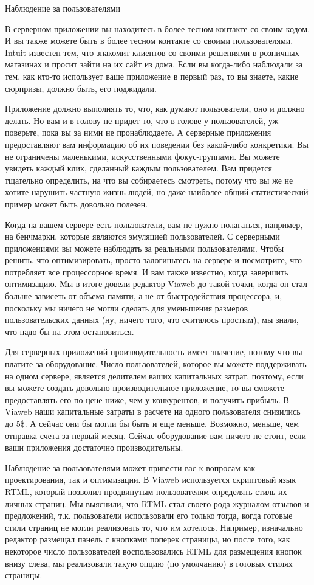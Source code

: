 \documentclass[ebook,12pt,oneside,openany]{memoir}
\begin{document}
Наблюдение за пользователями

В серверном приложении вы находитесь в более тесном контакте со своим
кодом. И вы также можете быть в более тесном контакте со своими
пользователями. Intuit известен тем, что знакомит клиентов со своими
решениями в розничных магазинах и просит зайти на их сайт из дома.
Если вы когда-либо наблюдали за тем, как кто-то использует ваше
приложение в первый раз, то вы знаете, какие сюрпризы, должно быть,
его поджидали.

Приложение должно выполнять то, что, как думают пользователи, оно и
должно делать. Но вам и в голову не придет то, что в голове у
пользователей, уж поверьте, пока вы за ними не пронаблюдаете. А
серверные приложения предоставляют вам информацию об их поведении без
какой-либо конкретики. Вы не ограничены маленькими, искусственными
фокус-группами. Вы можете увидеть каждый клик, сделанный каждым
пользователем. Вам придется тщательно определить, на что вы
собираетесь смотреть, потому что вы же не хотите нарушить частную
жизнь людей, но даже наиболее общий статистический пример может быть
довольно полезен.

Когда на вашем сервере есть пользователи, вам не нужно полагаться,
например, на бенчмарки, которые являются эмуляцией пользователей. С
серверными приложениями вы можете наблюдать за реальными
пользователями. Чтобы решить, что оптимизировать, просто залогиньтесь
на сервере и посмотрите, что потребляет все процессорное время. И вам
также известно, когда завершить оптимизацию. Мы в итоге довели
редактор Viaweb до такой точки, когда он стал больше зависеть от
объема памяти, а не от быстродействия процессора, и, поскольку мы
ничего не могли сделать для уменьшения размеров пользовательских
данных (ну, ничего того, что считалось простым), мы знали, что надо бы
на этом остановиться.

Для серверных приложений производительность имеет значение, потому что
вы платите за оборудование. Число пользователей, которое вы можете
поддерживать на одном сервере, является делителем ваших капитальных
затрат, поэтому, если вы можете создать довольно производительное
приложение, то вы сможете предоставлять его по цене ниже, чем у
конкурентов, и получить прибыль. В Viaweb наши капитальные затраты в
расчете на одного пользователя снизились до 5\$. А сейчас они бы могли
бы быть и еще меньше. Возможно, меньше, чем отправка счета за первый
месяц. Сейчас оборудование вам ничего не стоит, если ваши приложения
достаточно производительны.

Наблюдение за пользователями может привести вас к вопросам как
проектирования, так и оптимизации. В Viaweb используется скриптовый
язык RTML, который позволил продвинутым пользователям определять стиль
их личных страниц. Мы выяснили, что RTML стал своего рода журналом
отзывов и предложений, т.к. пользователи использовали его только
тогда, когда готовые стили страниц не могли реализовать то, что им
хотелось. Например, изначально редактор размещал панель с кнопками
поперек страницы, но после того, как некоторое число пользователей
воспользовались RTML для размещения кнопок внизу слева, мы реализовали
такую опцию (по умолчанию) в готовых стилях страницы.
\end{document}
